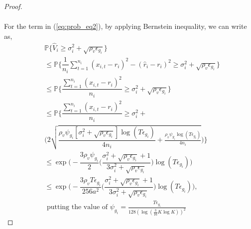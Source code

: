 \begin{proof}
\begin{align*}
\end{align*}
 
  
For the term in (\ref{eq:prob_eq2}), by applying Bernstein inequality, we can write as,
\begin{align*}
&\mathbb{P}\bigg\lbrace \hat{V}_{i}\geq \sigma_{i}^{2}+\sqrt{\rho_{v}\epsilon_{g_{i}}}\bigg\rbrace\\
&\leq \mathbb{P}\bigg\lbrace \dfrac{1}{n_{i}}\sum_{t=1}^{n_{i}}(x_{i,t}-r_{i})^{2}-(\hat{r}_{i}-r_{i})^{2}\geq \sigma_{i}^{2}+\sqrt{\rho_{v}\epsilon_{g_{i}}}\bigg\rbrace\\
&\leq \mathbb{P}\bigg\lbrace \dfrac{\sum_{t=1}^{n_{i}}(x_{i,t}-r_{i})^{2}}{n_{i}}\geq \sigma_{i}^{2}+\sqrt{\rho_{v}\epsilon_{g_{i}}} \bigg\rbrace\\
&\leq \mathbb{P}\bigg\lbrace \dfrac{\sum_{t=1}^{n_{i}}(x_{i,t}-r_{i})^{2}}{n_{i}}\geq \sigma_{i}^{2} +\\
&\bigg(2\sqrt{\dfrac{\rho_v\psi_{g_i} [\sigma_{i}^{2}+\sqrt{\rho_{v}\epsilon_{g_{i}}}]\log( T\epsilon_{g_{i}})}{4n_{i}}+\frac{\rho_v\psi_{g_i}  \log{(T\epsilon_{g_{i}})}}{4 n_{i}}}\bigg)\bigg\rbrace\\
&\leq \exp\bigg(- \dfrac{3\rho_v\psi_{g_i}}{2} \bigg(\dfrac{\sigma_{i}^{2}+\sqrt{\rho_{v}\epsilon_{g_{i}}}+1}{3\sigma_{i}^{2}+\sqrt{\rho_v \epsilon_{g_{i}}}}\bigg) \log( T\epsilon_{g_{i}}) \bigg) \\
&\leq \exp\bigg(- \dfrac{3\rho_vT\epsilon_{g_i}}{256 a^2 } \bigg(\dfrac{\sigma_{i}^{2}+\sqrt{\rho_{v}\epsilon_{g_{i}}}+1}{3\sigma_{i}^{2}+\sqrt{\rho_v \epsilon_{g_{i}}}}\bigg) \log( T\epsilon_{g_{i}}) \bigg),\\
&\text{ putting the value of $\psi_{g_i}=\frac{T\epsilon_{g_i}}{128(\log(\frac{3}{16} K\log K))^{2}}$}
\end{align*}
 

\end{proof}
